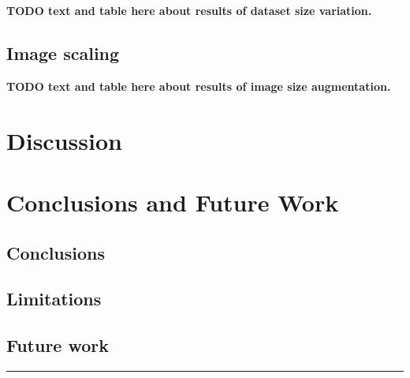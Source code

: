 \documentclass[english, bibtex]{kththesis}
\begin{document}
\textbf{TODO text and table here about results of dataset size variation.}

\section{Image scaling}

\textbf{TODO text and table here about results of image size augmentation.}


\chapter{Discussion}
\label{ch:disc}

\chapter{Conclusions and Future Work}
\label{ch:conc}
\section{Conclusions}
\section{Limitations}
\section{Future work}


\noindent\rule{\textwidth}{0.4mm}

\cleardoublepage
\renewcommand{\bibname}{References}

\ifbiblatex
    \printbibliography[heading=bibintoc]
\else
    
\fi



\appendix
\renewcommand{\chaptermark}[1]{\markboth{Appendix \thechapter\relax:\thinspace\relax#1}{}}


\label{pg:lastPageofMainmatter}

\clearpage
\fancyhead{}  %
\end{document}
